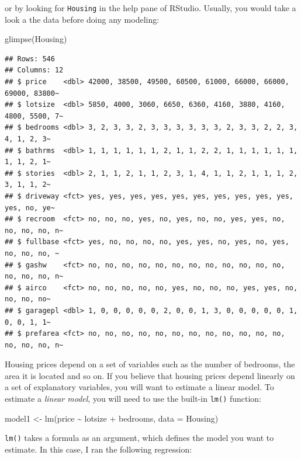 \documentclass[
]{article}
\newenvironment{Shaded}{\begin{snugshade}}{\end{snugshade}}
\newcommand{\AttributeTok}[1]{\textcolor[rgb]{0.77,0.63,0.00}{#1}}
\newcommand{\FunctionTok}[1]{\textcolor[rgb]{0.00,0.00,0.00}{#1}}
\newcommand{\NormalTok}[1]{#1}
\newcommand{\OtherTok}[1]{\textcolor[rgb]{0.56,0.35,0.01}{#1}}
\newcommand{\SpecialCharTok}[1]{\textcolor[rgb]{0.00,0.00,0.00}{#1}}
\begin{document}
or by looking for \texttt{Housing} in the help pane of RStudio. Usually, you would take a look a the data
before doing any modeling:

\begin{Shaded}
\begin{Highlighting}[]
\FunctionTok{glimpse}\NormalTok{(Housing)}
\end{Highlighting}
\end{Shaded}

\begin{verbatim}
## Rows: 546
## Columns: 12
## $ price    <dbl> 42000, 38500, 49500, 60500, 61000, 66000, 66000, 69000, 83800~
## $ lotsize  <dbl> 5850, 4000, 3060, 6650, 6360, 4160, 3880, 4160, 4800, 5500, 7~
## $ bedrooms <dbl> 3, 2, 3, 3, 2, 3, 3, 3, 3, 3, 3, 2, 3, 3, 2, 2, 3, 4, 1, 2, 3~
## $ bathrms  <dbl> 1, 1, 1, 1, 1, 1, 2, 1, 1, 2, 2, 1, 1, 1, 1, 1, 1, 1, 1, 2, 1~
## $ stories  <dbl> 2, 1, 1, 2, 1, 1, 2, 3, 1, 4, 1, 1, 2, 1, 1, 1, 2, 3, 1, 1, 2~
## $ driveway <fct> yes, yes, yes, yes, yes, yes, yes, yes, yes, yes, yes, no, ye~
## $ recroom  <fct> no, no, no, yes, no, yes, no, no, yes, yes, no, no, no, no, n~
## $ fullbase <fct> yes, no, no, no, no, yes, yes, no, yes, no, yes, no, no, no, ~
## $ gashw    <fct> no, no, no, no, no, no, no, no, no, no, no, no, no, no, no, n~
## $ airco    <fct> no, no, no, no, no, yes, no, no, no, yes, yes, no, no, no, no~
## $ garagepl <dbl> 1, 0, 0, 0, 0, 0, 2, 0, 0, 1, 3, 0, 0, 0, 0, 0, 1, 0, 0, 1, 1~
## $ prefarea <fct> no, no, no, no, no, no, no, no, no, no, no, no, no, no, no, n~
\end{verbatim}

Housing prices depend on a set of variables such as the number of bedrooms, the area it is located
and so on. If you believe that housing prices depend linearly on a set of explanatory variables,
you will want to estimate a linear model. To estimate a \emph{linear model}, you will need to use the
built-in \texttt{lm()} function:

\begin{Shaded}
\begin{Highlighting}[]
\NormalTok{model1 }\OtherTok{\textless{}{-}} \FunctionTok{lm}\NormalTok{(price }\SpecialCharTok{\textasciitilde{}}\NormalTok{ lotsize }\SpecialCharTok{+}\NormalTok{ bedrooms, }\AttributeTok{data =}\NormalTok{ Housing)}
\end{Highlighting}
\end{Shaded}

\texttt{lm()} takes a formula as an argument, which defines the model you want to estimate. In this case,
I ran the following regression:
\end{document}
